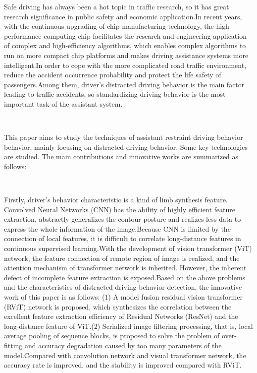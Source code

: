 \begin{englishabstract}

   Safe driving has always been a hot topic in traffic research, so it has great research significance in public safety and economic application.In recent years, with the continuous upgrading of chip manufacturing technology, the high-performance computing chip facilitates the research and engineering application of complex and high-efficiency algorithms, which enables complex algorithms to run on more compact chip platforms and makes driving assistance systems more intelligent.In order to cope with the more complicated road traffic environment, reduce the accident occurrence probability and protect the life safety of passengers.Among them, driver's distracted driving behavior is the main factor leading to traffic accidents, so standardizing driving behavior is the most important task of the assistant system.
   \par~\par
   This paper aims to study the techniques of assistant restraint driving behavior behavior, mainly focusing on distracted driving behavior. Some key technologies are studied. The main contributions and innovative works are summarized as follows:
   \par~\par
   Firstly, driver's behavior characteristic is a kind of limb synthesis feature. Convolved Neural Networks (CNN) has the ability of highly efficient feature extraction, abstractly generalizes the contour posture and realizes less data to express the whole information of the image.Because CNN is limited by the connection of local features, it is difficult to correlate long-distance features in continuous supervised learning.With the development of vision transformer (ViT) network, the feature connection of remote region of image is realized, and the attention mechanism of transformer network is inherited. However, the inherent defect of incomplete feature extraction is exposed.Based on the above problems and the characteristics of distracted driving behavior detection, the innovative work of this paper is as follows: (1) A model fusion residual vision transformer (RViT) network is proposed, which synthesizes the correlation between the excellent feature extraction efficiency of Residual Networks (ResNet) and the long-distance feature of ViT.(2) Serialized image filtering processing, that is, local average pooling of sequence blocks, is proposed to solve the problem of over-fitting and accuracy degradation caused by too many parameters of the model.Compared with convolution network and visual transformer network, the accuracy rate is improved, and the stability is improved compared with RViT.

\end{englishabstract}
